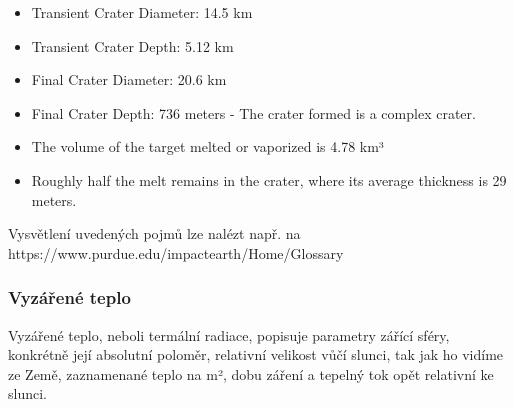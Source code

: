 \documentclass[
]{article}
\providecommand{\tightlist}{%
  \setlength{\itemsep}{0pt}\setlength{\parskip}{0pt}}
\begin{document}
\begin{itemize}
\tightlist
\item
  Transient Crater Diameter: 14.5 km
\item
  Transient Crater Depth: 5.12 km
\item
  Final Crater Diameter: 20.6 km
\item
  Final Crater Depth: 736 meters - The crater formed is a complex
  crater.
\item
  The volume of the target melted or vaporized is 4.78 km³
\item
  Roughly half the melt remains in the crater, where its average
  thickness is 29 meters.
\end{itemize}

Vysvětlení uvedených pojmů lze nalézt např. na
https://www.purdue.edu/impactearth/Home/Glossary

\hypertarget{vyzuxe1ux159enuxe9-teplo}{%
\subsubsection{Vyzářené teplo}\label{vyzuxe1ux159enuxe9-teplo}}

Vyzářené teplo, neboli termální radiace, popisuje parametry zářící
sféry, konkrétně její absolutní poloměr, relativní velikost vůčí slunci,
tak jak ho vidíme ze Země, zaznamenané teplo na m², dobu záření a
tepelný tok opět relativní ke slunci.
\end{document}
